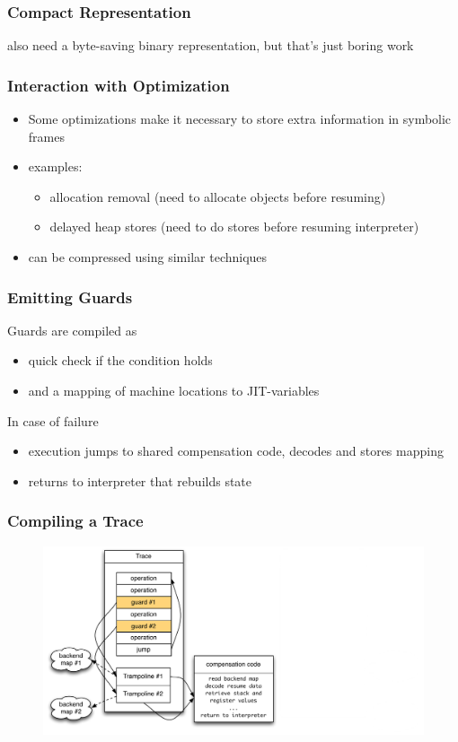 \documentclass[utf8x]{beamer}
\begin{document}
\begin{frame}
  \frametitle{Compact Representation}
    also need a byte-saving binary representation, but that's just boring work
\end{frame}


\begin{frame}
  \frametitle{Interaction with Optimization}
  \begin{itemize}
      \item Some optimizations make it necessary to store extra information in symbolic frames
      \pause
      \item examples:
          \begin{itemize}
              \item allocation removal (need to allocate objects before resuming)
              \item delayed heap stores (need to do stores before resuming interpreter)
          \end{itemize}
      \item can be compressed using similar techniques
  \end{itemize}
\end{frame}

\begin{frame}
  \frametitle{Emitting Guards}
  Guards are compiled as
  \begin{itemize}
    \item quick check if the condition holds
    \item and a mapping of machine locations to JIT-variables %
  \end{itemize}
  \pause
  In case of failure
  \begin{itemize}
    \item execution jumps to shared compensation code, decodes and stores mapping
    \item returns to interpreter that rebuilds state
  \end{itemize}
\end{frame}

\begin{frame}
  \frametitle{Compiling a Trace}
  \begin{figure}
  \centering
  \includegraphics[width=1\textwidth]{figures/loop.pdf}
  \end{figure}
\end{frame}
\end{document}
